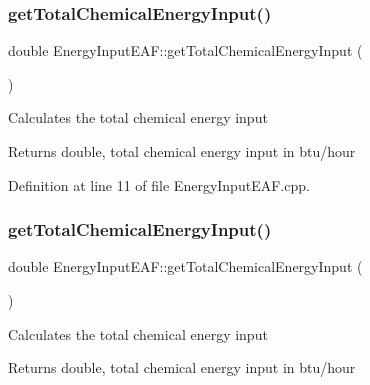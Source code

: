 \subsubsection{\texorpdfstring{get\+Total\+Chemical\+Energy\+Input()}{getTotalChemicalEnergyInput()}\hspace{0.1cm}{\footnotesize\ttfamily [1/3]}}
{\footnotesize\ttfamily double Energy\+Input\+E\+A\+F\+::get\+Total\+Chemical\+Energy\+Input (\begin{DoxyParamCaption}{ }\end{DoxyParamCaption})}

Calculates the total chemical energy input \begin{DoxyReturn}{Returns}
double, total chemical energy input in btu/hour 
\end{DoxyReturn}


Definition at line 11 of file Energy\+Input\+E\+A\+F.\+cpp.

\mbox{\label{class_energy_input_e_a_f_a44b4a70dcc3e5f0bf9d33eabd6158b2f}} 
\subsubsection{\texorpdfstring{get\+Total\+Chemical\+Energy\+Input()}{getTotalChemicalEnergyInput()}\hspace{0.1cm}{\footnotesize\ttfamily [2/3]}}
{\footnotesize\ttfamily double Energy\+Input\+E\+A\+F\+::get\+Total\+Chemical\+Energy\+Input (\begin{DoxyParamCaption}{ }\end{DoxyParamCaption})}

Calculates the total chemical energy input \begin{DoxyReturn}{Returns}
double, total chemical energy input in btu/hour 
\end{DoxyReturn}
\mbox{\label{class_energy_input_e_a_f_a44b4a70dcc3e5f0bf9d33eabd6158b2f}} 
